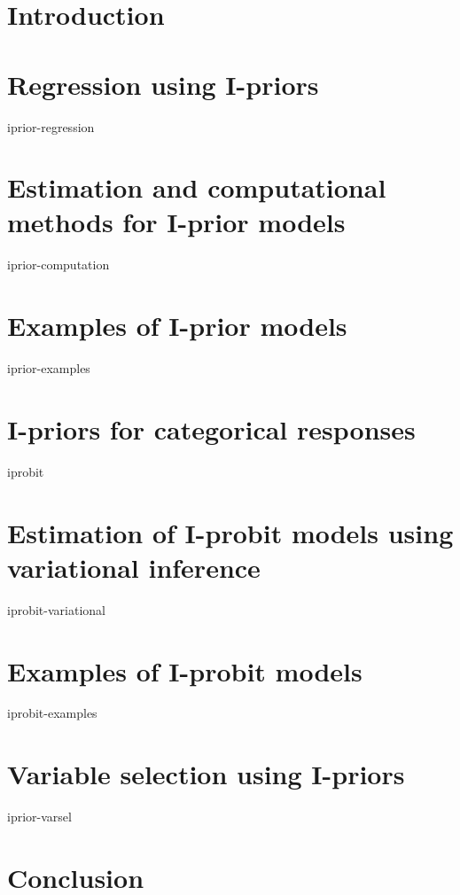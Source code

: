 \documentclass[a4paper,11pt,showframe]{report}
\begin{document}
\chapter{Introduction} 

\chapter{Regression using I-priors}
{iprior-regression}

\chapter{Estimation and computational methods for I-prior models}
{iprior-computation}

\chapter{Examples of I-prior models}
{iprior-examples}

\chapter{I-priors for categorical responses}
{iprobit}

\chapter{Estimation of I-probit models using variational inference}
{iprobit-variational}

\chapter{Examples of I-probit models}
{iprobit-examples}

\chapter{Variable selection using I-priors}
{iprior-varsel}

\chapter{Conclusion}


\hPrintBibliography
\end{document}
